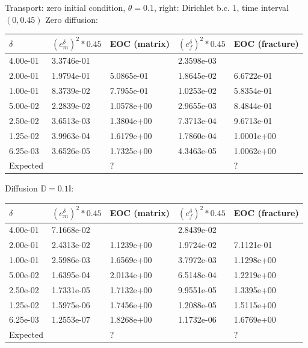 \documentclass{llncs}
\def\tn#1{{\mathbb{#1}}}    %
\begin{document}
Transport: zero initial condition, $\theta=0.1$, right: Dirichlet b.c. $1$, time interval $(0,0.45)$
Zero diffusion:

\begin{tabular}{|l|ll|ll|}
\hline
$\delta$ & $(e_m^\delta)^2*0.45$ & EOC (matrix) & $(e_f^\delta)^2*0.45$ & EOC (fracture)\\
\hline
4.00e-01 & 3.3746e-01 &            & 2.3598e-03 &           \\ 
2.00e-01 & 1.9794e-01 & 5.0865e-01 & 1.8645e-02 & 6.6722e-01\\  
1.00e-01 & 8.3739e-02 & 7.7955e-01 & 1.0253e-02 & 5.8354e-01\\
5.00e-02 & 2.2839e-02 & 1.0578e+00 & 2.9655e-03 & 8.4844e-01\\
2.50e-02 & 3.6513e-03 & 1.3804e+00 & 7.3713e-04 & 9.6713e-01\\
1.25e-02 & 3.9963e-04 & 1.6179e+00 & 1.7860e-04 & 1.0001e+00\\
6.25e-03 & 3.6526e-05 & 1.7325e+00 & 4.3463e-05 & 1.0062e+00\\
\hline
Expected & & ? & & ?\\
\hline
\end{tabular}

Diffusion $\tn D=0.1\tn I$:

\begin{tabular}{|l|ll|ll|}
\hline
$\delta$ & $(e_m^\delta)^2*0.45$ & EOC (matrix) & $(e_f^\delta)^2*0.45$ & EOC (fracture)\\
\hline
4.00e-01 & 7.1668e-02 &            & 2.8439e-02 &            \\
2.00e-01 & 2.4313e-02 & 1.1239e+00 & 1.9724e-02 & 7.1121e-01 \\
1.00e-01 & 2.5986e-03 & 1.6569e+00 & 3.7972e-03 & 1.1298e+00 \\
5.00e-02 & 1.6395e-04 & 2.0134e+00 & 6.5148e-04 & 1.2219e+00 \\
2.50e-02 & 1.7331e-05 & 1.7132e+00 & 9.9551e-05 & 1.3395e+00 \\
1.25e-02 & 1.5975e-06 & 1.7456e+00 & 1.2088e-05 & 1.5115e+00 \\
6.25e-03 & 1.2553e-07 & 1.8268e+00 & 1.1732e-06 & 1.6769e+00 \\
\hline
Expected & & ? & & ?\\
\hline
\end{tabular}


%





\end{document}
